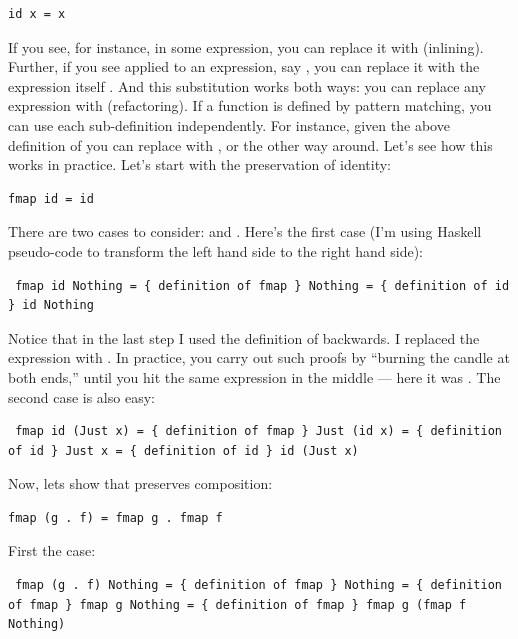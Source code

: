 \begin{verbatim}
id x = x
\end{verbatim}

If you see, for instance,  in some expression, you can
replace it with  (inlining). Further, if you see 
applied to an expression, say , you can replace it
with the expression itself . And this substitution
works both ways: you can replace any expression  with
 (refactoring). If a function is defined by pattern
matching, you can use each sub-definition independently. For instance,
given the above definition of  you can replace
 with , or the other way
around. Let's see how this works in practice. Let's start with the
preservation of identity:

\begin{verbatim}
fmap id = id
\end{verbatim}

There are two cases to consider:  and .
Here's the first case (I'm using Haskell pseudo-code to transform the
left hand side to the right hand side):

\begin{verbatim}
 fmap id Nothing = { definition of fmap } Nothing = { definition of id } id Nothing
\end{verbatim}

Notice that in the last step I used the definition of 
backwards. I replaced the expression  with
. In practice, you carry out such proofs by
``burning the candle at both ends,'' until you hit the same expression
in the middle --- here it was . The second case is also
easy:

\begin{verbatim}
 fmap id (Just x) = { definition of fmap } Just (id x) = { definition of id } Just x = { definition of id } id (Just x)
\end{verbatim}

Now, lets show that  preserves composition:

\begin{verbatim}
fmap (g . f) = fmap g . fmap f
\end{verbatim}

First the  case:

\begin{verbatim}
 fmap (g . f) Nothing = { definition of fmap } Nothing = { definition of fmap } fmap g Nothing = { definition of fmap } fmap g (fmap f Nothing)
\end{verbatim}

